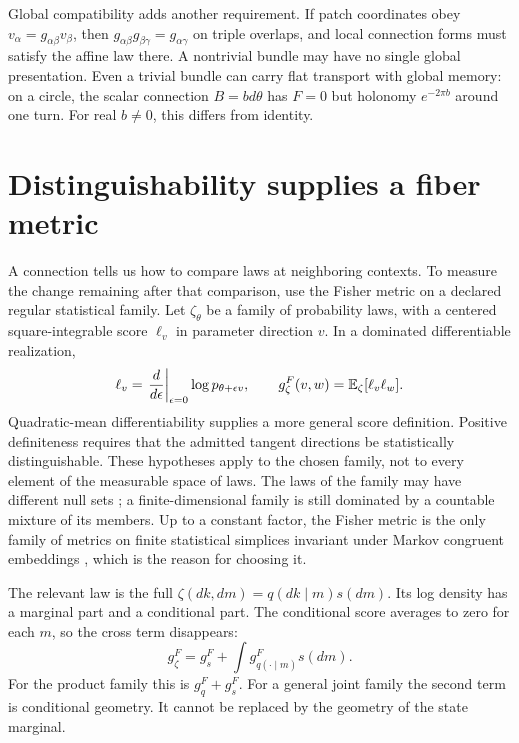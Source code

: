 Global compatibility adds another requirement. If patch coordinates obey $v_\alpha=g_{\alpha\beta}v_\beta$, then $g_{\alpha\beta}g_{\beta\gamma}=g_{\alpha\gamma}$ on triple overlaps, and local connection forms must satisfy the affine law there. A nontrivial bundle may have no single global presentation. Even a trivial bundle can carry flat transport with global memory: on a circle, the scalar connection $B=b d\theta$ has $F=0$ but holonomy $e^{-2\pi b}$ around one turn. For real $b\ne0$, this differs from identity.

\section{Distinguishability supplies a fiber metric}

A connection tells us how to compare laws at neighboring contexts. To measure the change remaining after that comparison, use the Fisher metric on a declared regular statistical family. Let $\zeta_\theta$ be a family of probability laws, with a centered square-integrable score $\ell_v$ in parameter direction $v$. In a dominated differentiable realization,
\begin{equation}
\ell_v=\left.\frac{d}{d\epsilon}\right|_{\epsilon=0}
\log p_{\theta+\epsilon v},
\qquad
g^F_\zeta(v,w)=\mathbb E_\zeta[\ell_v\ell_w].
\end{equation}
Quadratic-mean differentiability supplies a more general score definition. Positive definiteness requires that the admitted tangent directions be statistically distinguishable. These hypotheses apply to the chosen family, not to every element of the measurable space of laws. The laws of the family may have different null sets \citep{AyJostLeSchwachhofer2018}; a finite-dimensional family is still dominated by a countable mixture of its members. Up to a constant factor, the Fisher metric is the only family of metrics on finite statistical simplices invariant under Markov congruent embeddings \citep{Cencov1982}, which is the reason for choosing it.

The relevant law is the full $\zeta(dk,dm)=q(dk\mid m)s(dm)$. Its log density has a marginal part and a conditional part. The conditional score averages to zero for each $m$, so the cross term disappears:
\begin{equation}
g^F_\zeta=g^F_s+\int g^F_{q(\cdot\mid m)}s(dm).
\end{equation}
For the product family this is $g^F_q+g^F_s$. For a general joint family the second term is conditional geometry. It cannot be replaced by the geometry of the state marginal.

